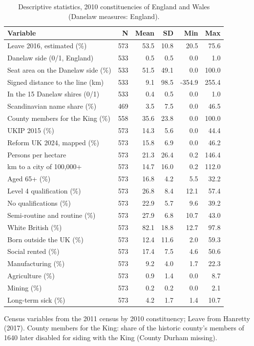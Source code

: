 \documentclass[11pt,a4paper]{article}
\begin{document}
\begin{table}[tbp]\centering\footnotesize\caption{Descriptive statistics, 2010 constituencies of England and Wales (Danelaw measures: England).}\label{tab:desc}\begin{tabular}{lrrrrr}\toprule Variable & N & Mean & SD & Min & Max\\\midrule
Leave 2016, estimated (\%) & 573 & 53.5 & 10.8 & 20.5 & 75.6\\
Danelaw side (0/1, England) & 533 & 0.5 & 0.5 & 0.0 & 1.0\\
Seat area on the Danelaw side (\%) & 533 & 51.5 & 49.1 & 0.0 & 100.0\\
Signed distance to the line (km) & 533 & 9.1 & 98.5 & -354.9 & 255.4\\
In the 15 Danelaw shires (0/1) & 533 & 0.4 & 0.5 & 0.0 & 1.0\\
Scandinavian name share (\%) & 469 & 3.5 & 7.5 & 0.0 & 46.5\\
County members for the King (\%) & 558 & 35.6 & 23.8 & 0.0 & 100.0\\
UKIP 2015 (\%) & 573 & 14.3 & 5.6 & 0.0 & 44.4\\
Reform UK 2024, mapped (\%) & 573 & 15.8 & 6.9 & 0.0 & 46.2\\
Persons per hectare & 573 & 21.3 & 26.4 & 0.2 & 146.4\\
km to a city of 100,000+ & 573 & 14.7 & 16.0 & 0.2 & 112.0\\
Aged 65+ (\%) & 573 & 16.8 & 4.2 & 5.5 & 32.2\\
Level 4 qualification (\%) & 573 & 26.8 & 8.4 & 12.1 & 57.4\\
No qualifications (\%) & 573 & 22.9 & 5.7 & 9.6 & 39.2\\
Semi-routine and routine (\%) & 573 & 27.9 & 6.8 & 10.7 & 43.0\\
White British (\%) & 573 & 82.1 & 18.8 & 12.7 & 97.8\\
Born outside the UK (\%) & 573 & 12.4 & 11.6 & 2.0 & 59.3\\
Social rented (\%) & 573 & 17.4 & 7.5 & 4.6 & 50.6\\
Manufacturing (\%) & 573 & 9.2 & 4.0 & 1.7 & 22.3\\
Agriculture (\%) & 573 & 0.9 & 1.4 & 0.0 & 8.7\\
Mining (\%) & 573 & 0.2 & 0.2 & 0.0 & 2.1\\
Long-term sick (\%) & 573 & 4.2 & 1.7 & 1.4 & 10.7\\
\bottomrule\end{tabular}\par\vspace{0.3em}\parbox{0.92\textwidth}{\scriptsize Census variables from the 2011 census by 2010 constituency; Leave from Hanretty (2017). County members for the King: share of the historic county's members of 1640 later disabled for siding with the King (County Durham missing).}\end{table}
\end{document}

